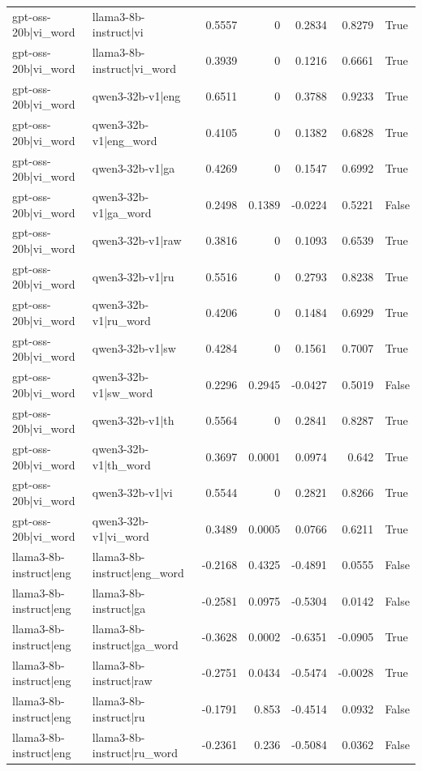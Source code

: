 \begin{table}
\begin{tabular}{l l r r r r l}
gpt-oss-20b|vi_word & llama3-8b-instruct|vi & 0.5557 & 0 & 0.2834 & 0.8279 & True \\
gpt-oss-20b|vi_word & llama3-8b-instruct|vi_word & 0.3939 & 0 & 0.1216 & 0.6661 & True \\
gpt-oss-20b|vi_word & qwen3-32b-v1|eng & 0.6511 & 0 & 0.3788 & 0.9233 & True \\
gpt-oss-20b|vi_word & qwen3-32b-v1|eng_word & 0.4105 & 0 & 0.1382 & 0.6828 & True \\
gpt-oss-20b|vi_word & qwen3-32b-v1|ga & 0.4269 & 0 & 0.1547 & 0.6992 & True \\
gpt-oss-20b|vi_word & qwen3-32b-v1|ga_word & 0.2498 & 0.1389 & -0.0224 & 0.5221 & False \\
gpt-oss-20b|vi_word & qwen3-32b-v1|raw & 0.3816 & 0 & 0.1093 & 0.6539 & True \\
gpt-oss-20b|vi_word & qwen3-32b-v1|ru & 0.5516 & 0 & 0.2793 & 0.8238 & True \\
gpt-oss-20b|vi_word & qwen3-32b-v1|ru_word & 0.4206 & 0 & 0.1484 & 0.6929 & True \\
gpt-oss-20b|vi_word & qwen3-32b-v1|sw & 0.4284 & 0 & 0.1561 & 0.7007 & True \\
gpt-oss-20b|vi_word & qwen3-32b-v1|sw_word & 0.2296 & 0.2945 & -0.0427 & 0.5019 & False \\
gpt-oss-20b|vi_word & qwen3-32b-v1|th & 0.5564 & 0 & 0.2841 & 0.8287 & True \\
gpt-oss-20b|vi_word & qwen3-32b-v1|th_word & 0.3697 & 0.0001 & 0.0974 & 0.642 & True \\
gpt-oss-20b|vi_word & qwen3-32b-v1|vi & 0.5544 & 0 & 0.2821 & 0.8266 & True \\
gpt-oss-20b|vi_word & qwen3-32b-v1|vi_word & 0.3489 & 0.0005 & 0.0766 & 0.6211 & True \\
llama3-8b-instruct|eng & llama3-8b-instruct|eng_word & -0.2168 & 0.4325 & -0.4891 & 0.0555 & False \\
llama3-8b-instruct|eng & llama3-8b-instruct|ga & -0.2581 & 0.0975 & -0.5304 & 0.0142 & False \\
llama3-8b-instruct|eng & llama3-8b-instruct|ga_word & -0.3628 & 0.0002 & -0.6351 & -0.0905 & True \\
llama3-8b-instruct|eng & llama3-8b-instruct|raw & -0.2751 & 0.0434 & -0.5474 & -0.0028 & True \\
llama3-8b-instruct|eng & llama3-8b-instruct|ru & -0.1791 & 0.853 & -0.4514 & 0.0932 & False \\
llama3-8b-instruct|eng & llama3-8b-instruct|ru_word & -0.2361 & 0.236 & -0.5084 & 0.0362 & False \\

\end{tabular}
\end{table}
